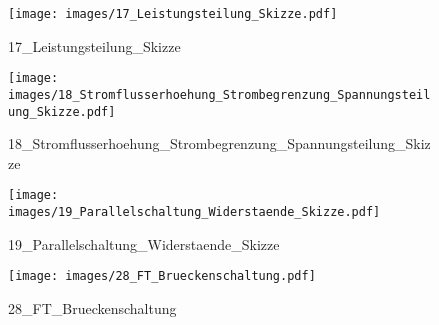 %
%
\begin{figure}[!hb]%
    \centering
  \texttt{[image: images/17\_Leistungsteilung\_Skizze.pdf]}%
  \caption{17_Leistungsteilung_Skizze}%
\end{figure}

%
%
\begin{figure}[!hb]%
    \centering
  \texttt{[image: images/18\_Stromflusserhoehung\_Strombegrenzung\_Spannungsteilung\_Skizze.pdf]}%
  \caption{18_Stromflusserhoehung_Strombegrenzung_Spannungsteilung_Skizze}%
\end{figure}

%
%
\begin{figure}[!hb]%
    \centering
  \texttt{[image: images/19\_Parallelschaltung\_Widerstaende\_Skizze.pdf]}%
  \caption{19_Parallelschaltung_Widerstaende_Skizze}%
\end{figure}

%
%
\begin{figure}[!hb]%
    \centering
  \texttt{[image: images/28\_FT\_Brueckenschaltung.pdf]}%
  \caption{28_FT_Brueckenschaltung}%
\end{figure}

